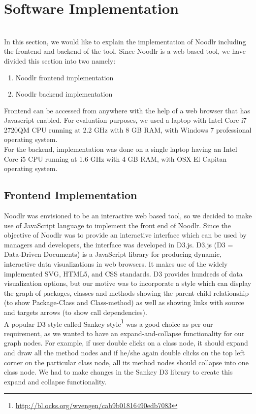 
\section{Software Implementation}
\label{sec:setup}
\\
In this section, we would like to explain the implementation of Noodlr including the frontend and backend of the tool. Since Noodlr is a web based tool, we have divided this section into two namely:
\begin{enumerate}
    \item Noodlr frontend implementation
    \item Noodlr backend implementation
\end{enumerate}

Frontend can be accessed from anywhere with the help of a web browser that has Javascript enabled. For evaluation purposes, we used a laptop with Intel Core i7-2720QM CPU running at 2.2 GHz with 8 GB RAM, with Windows 7 professional operating system.\\

For the backend, implementation was done on a single laptop having an Intel Core i5 CPU running at 1.6 GHz with 4 GB RAM, with OSX El Capitan operating system.

\subsection{Frontend Implementation}
Noodlr was envisioned to be an interactive web based tool, so we decided to make use of JavaScript language to implement the front end of Noodlr. Since the objective of Noodlr was to provide an interactive interface which can be used by managers and developers, the interface was developed in D3.js\cite{d3js}. D3.js (D3 = Data-Driven Documents) is a JavaScript library for producing dynamic, interactive data visualizations in web browsers. It makes use of the widely implemented SVG, HTML5, and CSS standards. D3 provides hundreds of data visualization options, but our motive was to incorporate a style which can display the graph of packages, classes and methods showing the parent-child relationship (to show Package-Class and Class-method) as well as showing links with source and targets arrows (to show call dependencies). \\

A popular D3 style called Sankey style\footnote{\url{http://bl.ocks.org/wvengen/cab9b01816490edb7083}} was a good choice as per our requirement, as we wanted to have an expand-and-collapse functionality for our graph nodes. For example, if user double clicks on a class node, it should expand and draw all the method nodes and if he/she again double clicks on the top left corner on the particular class node, all its method nodes should collapse into one class node. We had to make changes in the Sankey D3 library to create this expand and collapse functionality.\\

